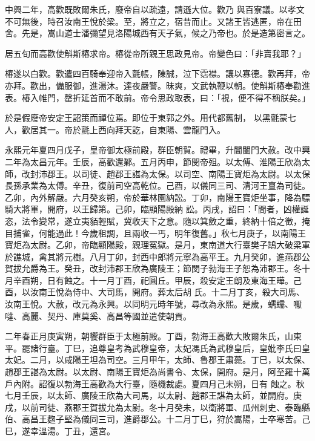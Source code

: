 \begin{pinyinscope}
 中興二年，高歡既敗爾朱氏，廢帝自以疏遠，請遜大位。歡乃
 與百寮議。以孝文不可無後，時召汝南王悅於梁。至，將立之，宿昔而止。又諸王皆逃匿，帝在田舍。先是，嵩山道士潘彌望見洛陽城西有天子氣，候之乃帝也。於是造第密言之。



 居五旬而高歡使斛斯椿求帝。椿從帝所親王思政見帝。帝變色曰：「非賣我耶？」



 椿遂以白歡。歡遣四百騎奉迎帝入氈帳，陳誠，泣下霑襟。讓以寡德。歡再拜，帝亦拜。歡出，備服御，進湯沐。達夜嚴警。昧爽，文武執鞭以朝。使斛斯椿奉勸進表。椿入帷門，罄折延首而不敢前。帝令思政取表，曰：「視，便不得不稱朕矣。」



 於是假廢帝安定王詔策而禪位焉。即位于東郭之外。用代都舊制，
 以黑氈蒙七人，歡居其一。帝於氈上西向拜天訖，自東陽、雲龍門入。



 永熙元年夏四月戊子，皇帝御太極前殿，群臣朝賀。禮畢，升閶闔門大赦。改中興二年為太昌元年。壬辰，高歡還鄴。五月丙申，節閔帝殂。以太傅、淮陽王欣為太師，改封沛郡王。以司徒、趙郡王諶為太保。以司空、南陽王寶炬為太尉。以太保長孫承業為太傅。辛丑，復前司空高乾位。己酉，以儀同三司、清河王亶為司徒。乙卯，內外解嚴。六月癸亥朔，帝於華林園納訟。丁卯，南陽王寶炬坐事，降為驃騎大將軍，開府，以王歸第。己卯，臨顯陽殿納
 訟。丙戌，詔曰：「間者，凶權誕恣，法令變常，遂立夷貊輕賦，冀收天下之意。隨以箕斂之重，終納十倍之徵，掩目捕雀，何能過此！今歲租調，且兩收一丐，明年復舊。」秋七月庚子，以南陽王寶炬為太尉。乙卯，帝臨顯陽殿，親理冤獄。是月，東南道大行臺樊子鵠大破梁軍於譙城，禽其將元樹。八月丁卯，封西中郎將元寧為高平王。九月癸卯，進燕郡公賀拔允爵為王。癸丑，改封沛郡王欣為廣陵王；節閔子勃海王子恕為沛郡王。冬十月辛酉朔，日有蝕之。十一月丁酉，祀圓丘。甲辰，殺安定王朗及東海王曄。己酉，以汝南王悅為侍中、大司馬，開府。葬太后胡
 氏。十二月丁亥，殺大司馬、汝南王悅。大赦，改元為永興。以同明元時年號，尋改為永熙。是歲，蠕蠕、嚈噠、高麗、契丹、庫莫奚、高昌等國並遣使朝貢。



 二年春正月庚寅朔，朝饗群臣于太極前殿。丁酉，勃海王高歡大敗爾朱氏，山東平。罷諸行臺。丁巳，追尊皇考為武穆皇帝，太妃馮氏為武穆皇后，皇妣李氏曰皇太妃。二月，以咸陽王坦為司空。三月甲午，太師、魯郡王肅薨。丁巳，以太保、趙郡王諶為太尉。以太尉、南陽王寶炬為尚書令、太保，開府。是月，阿至羅十萬戶內附。詔復以勃海王高歡為大行臺，隨機裁處。夏四月己未朔，日有
 蝕之。秋七月壬辰，以太師、廣陵王欣為大司馬，以太尉、趙郡王諶為太師，並開府。庚戌，以前司徒、燕郡王賀拔允為太尉。冬十月癸未，以衛將軍、瓜州刺史、泰臨縣伯、高昌王麴子堅為儀同三司，進爵郡公。十二月丁巳，狩於嵩陽，士卒寒苦。己巳，遂幸溫湯。丁丑，還宮。




\end{pinyinscope}
